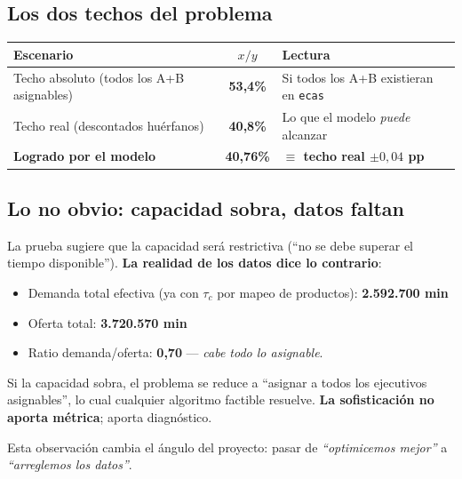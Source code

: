 \documentclass[11pt,a4paper]{article}
\newcommand{\rowamarillo}{\rowcolor{bcoamarilloclaro!30}}
\begin{document}
\subsection{Los dos techos del problema}

\begin{center}
\renewcommand{\arraystretch}{1.3}
\begin{tabular}{l c l}
\toprule
\rowcolor{bconegro}\textbf{\color{bcoamarillo}Escenario} & \textbf{\color{bcoamarillo}$x/y$} & \textbf{\color{bcoamarillo}Lectura} \\
\midrule
Techo absoluto (todos los A+B asignables) & \textbf{53,4\%} & Si todos los A+B existieran en \texttt{ecas} \\
\rowamarillo Techo real (descontados huérfanos) & \textbf{40,8\%} & Lo que el modelo \emph{puede} alcanzar \\
\textbf{Logrado por el modelo} & \textbf{40,76\%} & \textbf{\color{bcoverde}$\equiv$ techo real $\pm 0,04$ pp} \\
\bottomrule
\end{tabular}
\end{center}

\subsection{Lo no obvio: capacidad sobra, datos faltan}

\begin{decisionbox}
La prueba sugiere que la capacidad será restrictiva (``no se debe superar el tiempo disponible''). \textbf{La realidad de los datos dice lo contrario}:

\begin{itemize}
    \item Demanda total efectiva (ya con $\tau_c$ por mapeo de productos): \textbf{2.592.700 min}
    \item Oferta total: \textbf{3.720.570 min}
    \item Ratio demanda/oferta: \textbf{0,70} --- \emph{cabe todo lo asignable}.
\end{itemize}

Si la capacidad sobra, el problema se reduce a ``asignar a todos los ejecutivos asignables'', lo cual cualquier algoritmo factible resuelve. \textbf{La sofisticación no aporta métrica}; aporta diagnóstico.

Esta observación cambia el ángulo del proyecto: pasar de \emph{``optimicemos mejor''} a \emph{``arreglemos los datos''}.
\end{decisionbox}
\end{document}
